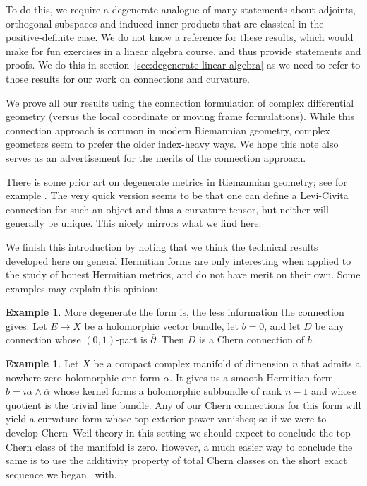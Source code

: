 \documentclass[10pt,a4paper]{amsart}
\theoremstyle{definition}
\newtheorem{exam}[theo]{Example}
\def\ov#1{\overline{#1}}
\begin{document}
To do this, we require a degenerate analogue of many statements about adjoints,
orthogonal subspaces and induced inner products that are classical in the
positive-definite case. We do not know a reference for these results, which
would make for fun exercises in a linear algebra course, and thus provide
statements and proofs. We do this in
section~\ref{sec:degenerate-linear-algebra} as we need to refer to those
results for our work on connections and curvature.

We prove all our results using the connection formulation of complex
differential geometry (versus the local coordinate or moving frame
formulations). While this connection approach is common in modern Riemannian
geometry, complex geometers seem to prefer the older index-heavy ways. We
hope this note also serves as an advertisement for the merits of the connection
approach.

There is some prior art on degenerate metrics in Riemannian geometry; see for example \cite{bel1975degenerate,stoica2011cartan,stoica2014singular}.
The very quick version seems to be that one can define a Levi-Civita connection for such an object and thus a curvature tensor, but neither will generally be unique.
This nicely mirrors what we find here.


We finish this introduction by noting that we think the technical results developed here on general Hermitian forms are only interesting when applied to the study of honest Hermitian metrics, and do not have merit on their own.
Some examples may explain this opinion:


\begin{exam}
More degenerate the form is, the less information the connection gives:
Let $E \to X$ be a holomorphic vector bundle, let $b = 0$, and let $D$ be any connection whose $(0,1)$-part is $\bar\partial$. Then $D$ is a Chern connection of $b$.
\end{exam}


\begin{exam}
Let $X$ be a compact complex manifold of dimension $n$
that admits a nowhere-zero holomorphic one-form $\alpha$.
It  gives us a smooth Hermitian form $b = i \alpha \wedge \ov \alpha$ whose kernel forms a holomorphic subbundle of rank $n-1$ and whose quotient is the trivial line bundle.
Any of our Chern connections for this form will yield a curvature form whose
top exterior power vanishes; so if we were to develop Chern--Weil theory in
this setting we should expect to conclude the top Chern class of the manifold
is zero. However, a much easier way to conclude the same is to use the
additivity property of total Chern classes on the short exact sequence we began
~with.%
\end{exam}
\end{document}
